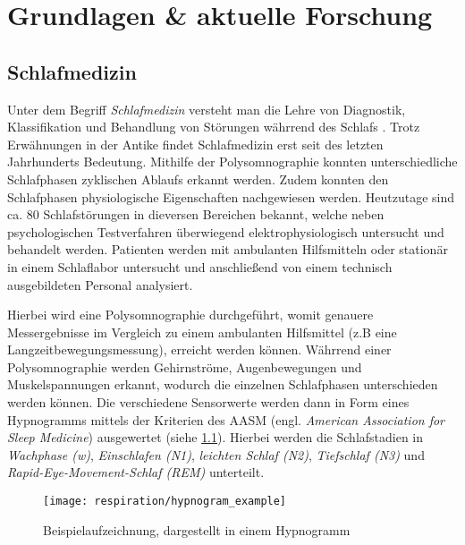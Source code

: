
\chapter{Grundlagen \& aktuelle Forschung}
\label{ch:Basics}

\section{Schlafmedizin}
\label{ch:Basics:se:schlafmedizin}
Unter dem Begriff \textit{Schlafmedizin} versteht man die Lehre von Diagnostik, Klassifikation und Behandlung von Störungen währrend des Schlafs \cite{schlafmedizin_1x1}. 
Trotz Erwähnungen in der Antike findet Schlafmedizin erst seit des letzten Jahrhunderts Bedeutung.
Mithilfe der Polysomnographie konnten unterschiedliche Schlafphasen zyklischen Ablaufs erkannt werden.
Zudem konnten den Schlafphasen physiologische Eigenschaften nachgewiesen werden.
Heutzutage sind ca. 80 Schlafstörungen in dieversen Bereichen bekannt, welche neben psychologischen Testverfahren überwiegend elektrophysiologisch untersucht und behandelt werden.
Patienten werden mit ambulanten Hilfsmitteln oder stationär in einem Schlaflabor untersucht und anschließend von einem technisch ausgebildeten Personal analysiert.

Hierbei wird eine Polysomnographie durchgeführt, womit genauere Messergebnisse im Vergleich zu einem ambulanten Hilfsmittel (z.B eine Langzeitbewegungsmessung), erreicht werden können.
Währrend einer Polysomnographie werden Gehirnströme, Augenbewegungen und Muskelspannungen erkannt, wodurch die einzelnen Schlafphasen unterschieden werden können.
Die verschiedene Sensorwerte werden dann in Form eines Hypnogramms mittels der Kriterien des AASM (engl. \textit{American Association for Sleep Medicine}) ausgewertet (siehe \ref{hypnogram_example}). 
Hierbei werden die Schlafstadien in \textit{Wachphase (w)}, \textit{Einschlafen (N1)}, \textit{leichten Schlaf (N2)}, \textit{Tiefschlaf (N3)} und \textit{Rapid-Eye-Movement-Schlaf (REM)} unterteilt.

\begin{figure}[ht]
    \centering
    \texttt{[image: respiration/hypnogram\_example]}
    \caption{Beispielaufzeichnung, dargestellt in einem Hypnogramm \cite{praxis_der_schlafmedizin}}
    \label{hypnogram_example}
\end{figure}

